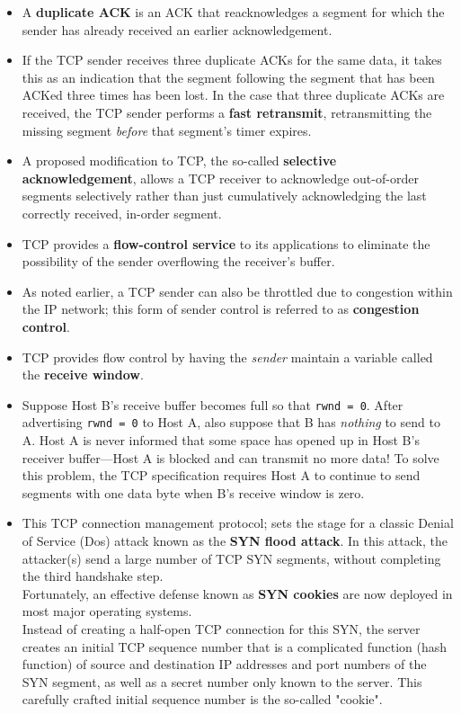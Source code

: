 \begin{itemize}
\item
A \textbf{duplicate ACK} is an ACK that reacknowledges a segment for which the sender has already received an earlier acknowledgement.

\item
If the TCP sender receives three duplicate ACKs for the same data, it takes this as an indication that the segment following the segment that has been ACKed three times has been lost. In the case that three duplicate ACKs are received, the TCP sender performs a \textbf{fast retransmit}, retransmitting the missing segment \textit{before} that segment's timer expires.

\item
A proposed modification to TCP, the so-called \textbf{selective acknowledgement}, allows a TCP receiver to acknowledge out-of-order segments selectively rather than just cumulatively acknowledging the last correctly received, in-order segment.

\item
TCP provides a \textbf{flow-control service} to its applications to eliminate the possibility of the sender overflowing the receiver's buffer.

\item
As noted earlier, a TCP sender can also be throttled due to congestion within the IP network; this form of sender control is referred to as \textbf{congestion control}.

\item
TCP provides flow control by having the \textit{sender} maintain a variable called the \textbf{receive window}.

\item
Suppose Host B's receive buffer becomes full so that \texttt{rwnd = 0}. After advertising \texttt{rwnd = 0} to Host A, also suppose that B has \textit{nothing} to send to A. Host A is never informed that some space has opened up in Host B's receiver buffer---Host A is blocked and can transmit no more data! To solve this problem, the TCP specification requires Host A to continue to send segments with one data byte when B's receive window is zero.

\item
This TCP connection management protocol; sets the stage for a classic Denial of Service (Dos) attack known as the \textbf{SYN flood attack}. In this attack, the attacker(s) send a large number of TCP SYN segments, without completing the third handshake step.\\
Fortunately, an effective defense known as \textbf{SYN cookies} are now deployed in most major operating systems.\\
Instead of creating a half-open TCP connection for this SYN, the server creates an initial TCP sequence number that is a complicated function (hash function) of source and destination IP addresses and port numbers of the SYN segment, as well as a secret number only known to the server. This carefully crafted initial sequence number is the so-called "cookie".


\end{itemize}
